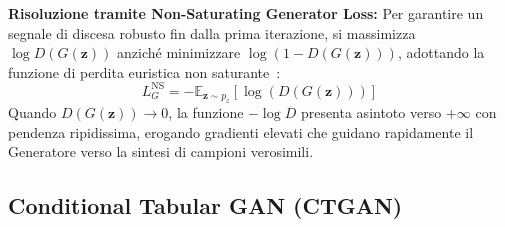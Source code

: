 \begin{table}[H]
\centering
\caption{Intensità del segnale di apprendimento al variare dell'abilità di inganno di $G$.}
\label{tab:dm-gradient-saturation}
\vspace{2mm}
\end{table}

\textbf{Risoluzione tramite Non-Saturating Generator Loss:}
Per garantire un segnale di discesa robusto fin dalla prima iterazione, si massimizza $\log D(G(\mathbf{z}))$ anziché minimizzare $\log(1 - D(G(\mathbf{z})))$, adottando la funzione di perdita euristica non saturante~\cite{goodfellow2014}:
\begin{equation}
    L_G^{\text{NS}} = -\mathbb{E}_{\mathbf{z} \sim p_z}[\log(D(G(\mathbf{z})))]
\end{equation}
Quando $D(G(\mathbf{z})) \to 0$, la funzione $-\log D$ presenta asintoto verso $+\infty$ con pendenza ripidissima, erogando gradienti elevati che guidano rapidamente il Generatore verso la sintesi di campioni verosimili.

\FloatBarrier
\subsection{Conditional Tabular GAN (CTGAN)}
\label{subsec:dm-ctgan}

